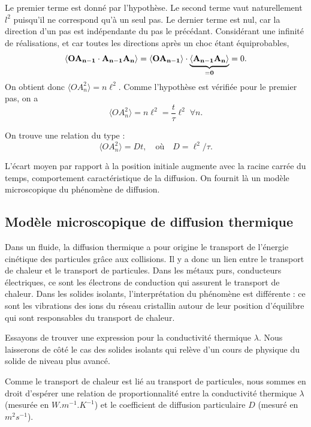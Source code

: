 \documentclass[11pt,a4paper]{report}
\begin{document}
Le premier terme est donné par l'hypothèse. Le second terme vaut naturellement $l^2$ puisqu'il ne correspond qu'à un seul pas. Le dernier terme est nul, car la direction d'un pas est indépendante du pas le précédant. Considérant une infinité de réalisations, et car toutes les directions après un choc étant équiprobables,
\begin{equation}
	\langle \bold{OA_{n-1}}\cdot\bold{A_{n-1}A_n}\rangle = \langle \bold{OA_{n-1}}\rangle\cdot\underbrace{\langle\bold{A_{n-1}A_n}\rangle}_{=\bold{0}} = 0.
\end{equation}
On obtient donc $\langle OA_n^2\rangle = n\ell^2$. Comme l'hypothèse est vérifiée pour le premier pas, on a 
\begin{equation}
	\langle OA_n^2 \rangle = n\ell^2 = \frac{t}{\tau}\ell^2\;\forall n.
\end{equation}

On trouve une relation du type :
\begin{equation}
	\langle OA_n^2 \rangle = Dt, \quad\text{où}\quad D = \ell^2/\tau.
\end{equation}

L'écart moyen par rapport à la position initiale augmente avec la racine carrée du temps, comportement caractéristique de la diffusion. On fournit là un modèle microscopique du phénomène de diffusion.

\subsection{Modèle microscopique de diffusion thermique}

Dans un fluide, la diffusion thermique a pour origine le transport de l'énergie cinétique des particules grâce aux collisions. Il y a donc un lien entre le transport de chaleur et le transport de particules. Dans les métaux purs, conducteurs électriques, ce sont les électrons de conduction qui assurent le transport de chaleur. Dans les solides isolants, l'interprétation du phénomène est différente : ce sont les vibrations des ions du réseau cristallin autour de leur position d'équilibre qui sont responsables du transport de chaleur. 

Essayons de trouver une expression pour la conductivité thermique $\lambda$. Nous laisserons de côté le cas des solides isolants qui relève d'un cours de physique du solide de niveau plus avancé. 

Comme le transport de chaleur est lié au transport de particules, nous sommes en droit d'espérer une relation de proportionnalité entre la conductivité thermique $\lambda$ (mesurée en $W.m^{-1}.K^{-1}$) et le coefficient de diffusion particulaire $D$ (mesuré en $m^2s^{-1}$).
\end{document}
